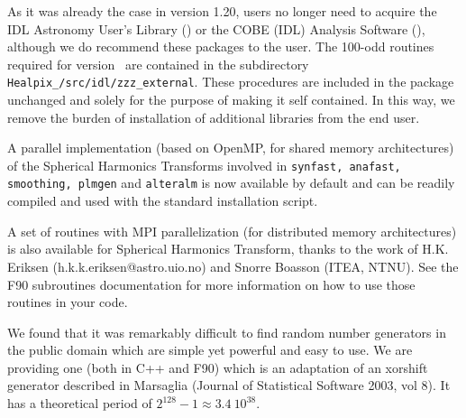 \documentclass[12pt,twoside]{article}
\begin{document}

As it was already the case in version 1.20, users no longer need to acquire the IDL
Astronomy User's Library ()
or the COBE (IDL) Analysis Software (),
although we do recommend these packages to the user.
The 100-odd routines required for version \hpxversion\ are contained in the
subdirectory {\tt Healpix\_\hpxversion/src/idl/zzz\_external}.
These procedures are included in the \healpix package unchanged and 
solely for the purpose of making it self contained. In this way,
we remove the burden of installation of additional libraries from 
the end user.

%


A parallel implementation (based on OpenMP, for shared memory architectures) of the Spherical Harmonics
Transforms involved in {\tt synfast, anafast, smoothing, plmgen} and {\tt alteralm} is now
available by default and can be readily compiled and used with the standard installation script. 

A set of routines with MPI parallelization (for distributed memory architectures)
 is also available for Spherical Harmonics Transform, thanks to the work of H.K. Eriksen
 (h.k.k.eriksen@astro.uio.no) and Snorre Boasson (ITEA, NTNU). See the F90
 subroutines documentation for more information on how to use those routines in
 your code.

We found that it was remarkably difficult to find 
random number generators in the public
domain which are simple yet
powerful and easy to use. 
We are providing one (both in C++ and F90) which is an adaptation of an xorshift generator described
 in Marsaglia (Journal of Statistical Software 2003, vol 8). It has a theoretical period of $2^{128}-1 \approx 3.4\ 10^{38}$.
\end{document}
